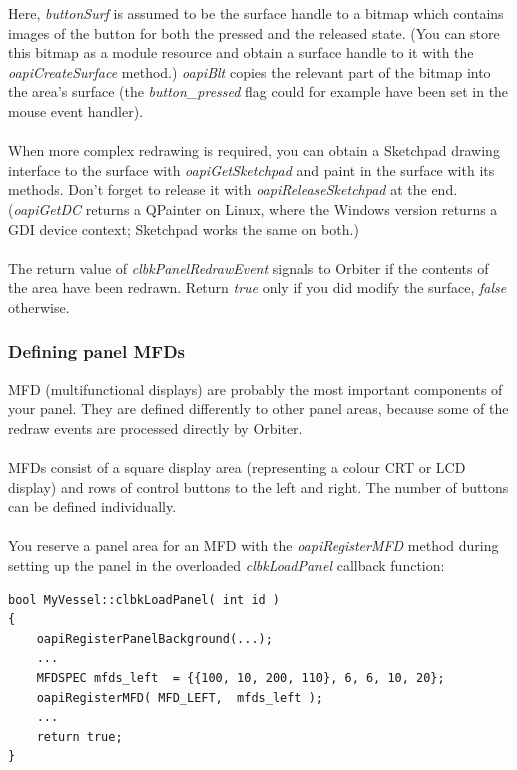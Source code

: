 \documentclass[Orbiter Developer Manual.tex]{subfiles}
\begin{document}
\noindent
Here, \textit{buttonSurf} is assumed to be the surface handle to a bitmap which contains images of the button for both the pressed and the released state. (You can store this bitmap as a module resource and obtain a surface handle to it with the \textit{oapiCreateSurface} method.) \textit{oapiBlt} copies the relevant part of the bitmap into the area's surface (the \textit{button\_pressed} flag could for example have been set in the mouse event handler).\\
\\
When more complex redrawing is required, you can obtain a Sketchpad drawing interface to the surface with \textit{oapiGetSketchpad} and paint in the surface with its methods. Don't forget to release it with \textit{oapiReleaseSketchpad} at the end. (\textit{oapiGetDC} returns a QPainter on Linux, where the Windows version returns a GDI device context; Sketchpad works the same on both.)\\
\\
The return value of \textit{clbkPanelRedrawEvent} signals to Orbiter if the contents of the area have been redrawn. Return \textit{true} only if you did modify the surface, \textit{false} otherwise.


\subsubsection{Defining panel MFDs}
\label{sssec:def_panel_mfd}
MFD (multifunctional displays) are probably the most important components of your panel. They are defined differently to other panel areas, because some of the redraw events are processed directly by Orbiter.\\
\\
MFDs consist of a square display area (representing a colour CRT or LCD display) and rows of control buttons to the left and right. The number of buttons can be defined individually.\\
\\
You reserve a panel area for an MFD with the \textit{oapiRegisterMFD} method during setting up the panel in the overloaded \textit{clbkLoadPanel} callback function:

\begin{lstlisting}
bool MyVessel::clbkLoadPanel( int id )
{
	oapiRegisterPanelBackground(...);
	...
	MFDSPEC mfds_left  = {{100, 10, 200, 110}, 6, 6, 10, 20};
	oapiRegisterMFD( MFD_LEFT,  mfds_left );
	...
	return true;
}
\end{lstlisting}
\end{document}
